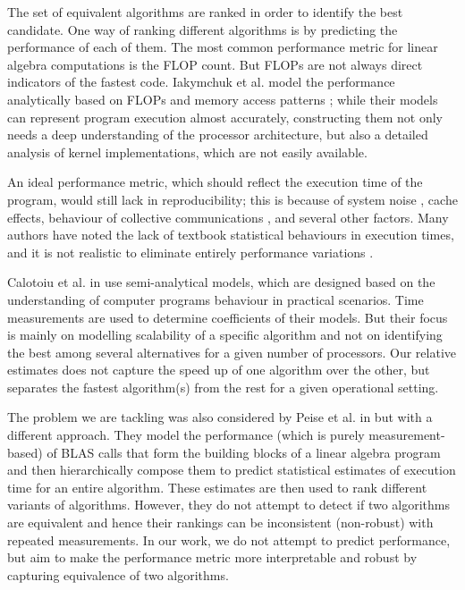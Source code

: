 \documentclass[conference]{IEEEtran}
\begin{document}
The set of equivalent algorithms are ranked in order to identify the best candidate. One way of ranking different algorithms is by predicting the performance of each of them. The most common performance metric for linear algebra computations is the FLOP count. But FLOPs are not always direct indicators of the fastest code\cite{barthels2019linnea}. Iakymchuk et al. model the performance analytically based on FLOPs and memory access patterns\cite{iakymchuk2012modeling} \cite{iakymchuk2011execution}; while their models can represent program execution almost accurately, constructing them not only needs a deep understanding of the processor architecture, but also a detailed analysis of kernel implementations, which are not easily available.

An ideal performance metric, which should reflect the execution time of the program, would still lack in reproducibility; this is because of system noise \cite{hoefler2010characterizing}, cache effects\cite{peise2014cache}, behaviour of
collective communications \cite{agarwal2005impact}, and several other factors. Many authors have noted the lack of
textbook statistical behaviours in execution times, and it is not realistic to eliminate entirely performance variations \cite{robustbenchmarking} \cite{trackingPerfVariation} \cite{statiscalperfCompare}. 

Calotoiu et al. in \cite{calotoiu2013} use semi-analytical models, which are designed based on the understanding of computer programs behaviour in practical scenarios. Time measurements are used to determine coefficients of their models. But their focus is mainly on modelling scalability of a specific algorithm and not on identifying the best among several alternatives for a given number of processors. Our relative estimates does not capture the speed up of one algorithm over the other, but separates the fastest algorithm(s) from the rest for a given operational setting.

The problem we are tackling was also considered by Peise et al. in \cite{peise2012performance} but with a different approach. They model the performance (which is purely measurement-based) of BLAS calls that form the building blocks of a linear algebra program and then hierarchically compose them to predict statistical estimates of execution time for an entire algorithm. These estimates are then used to rank different variants of algorithms. However, they do not attempt to detect if two algorithms are equivalent and hence their rankings can be inconsistent (non-robust) with repeated measurements. In our work, we do not attempt to predict performance, but aim to make the performance metric more interpretable  and robust by capturing equivalence of two algorithms.  
\end{document}
